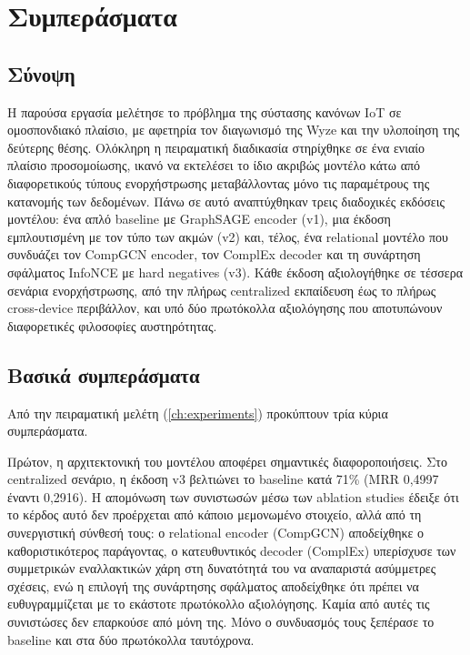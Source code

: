 \chapter{Συμπεράσματα}\label{ch:conclusions}

\section{Σύνοψη}\label{sec:concl-summary}
Η παρούσα εργασία μελέτησε το πρόβλημα της σύστασης κανόνων IoT σε ομοσπονδιακό πλαίσιο, με αφετηρία τον διαγωνισμό της Wyze και την υλοποίηση της δεύτερης θέσης. Ολόκληρη η πειραματική διαδικασία στηρίχθηκε σε ένα ενιαίο πλαίσιο προσομοίωσης, ικανό να εκτελέσει το ίδιο ακριβώς μοντέλο κάτω από διαφορετικούς τύπους ενορχήστρωσης μεταβάλλοντας μόνο τις παραμέτρους της κατανομής των δεδομένων. Πάνω σε αυτό αναπτύχθηκαν τρεις διαδοχικές εκδόσεις μοντέλου: ένα απλό baseline με GraphSAGE encoder (v1), μια έκδοση εμπλουτισμένη με τον τύπο των ακμών (v2) και, τέλος, ένα relational μοντέλο που συνδυάζει τον CompGCN encoder, τον ComplEx decoder και τη συνάρτηση σφάλματος InfoNCE με hard negatives (v3). Κάθε έκδοση αξιολογήθηκε σε τέσσερα σενάρια ενορχήστρωσης, από την πλήρως centralized εκπαίδευση έως το πλήρως cross-device περιβάλλον, και υπό δύο πρωτόκολλα αξιολόγησης που αποτυπώνουν διαφορετικές φιλοσοφίες αυστηρότητας.

\section{Βασικά συμπεράσματα}\label{sec:concl-findings}
Από την πειραματική μελέτη (\autoref{ch:experiments}) προκύπτουν τρία κύρια συμπεράσματα.

Πρώτον, η αρχιτεκτονική του μοντέλου αποφέρει σημαντικές διαφοροποιήσεις. Στο centralized σενάριο, η έκδοση v3 βελτιώνει το baseline κατά 71\% (MRR 0,4997 έναντι 0,2916). Η απομόνωση των συνιστωσών μέσω των ablation studies έδειξε ότι το κέρδος αυτό δεν προέρχεται από κάποιο μεμονωμένο στοιχείο, αλλά από τη συνεργιστική σύνθεσή τους: ο relational encoder (CompGCN) αποδείχθηκε ο καθοριστικότερος παράγοντας, ο κατευθυντικός decoder (ComplEx) υπερίσχυσε των συμμετρικών εναλλακτικών χάρη στη δυνατότητά του να αναπαριστά ασύμμετρες σχέσεις, ενώ η επιλογή της συνάρτησης σφάλματος αποδείχθηκε ότι πρέπει να ευθυγραμμίζεται με το εκάστοτε πρωτόκολλο αξιολόγησης. Καμία από αυτές τις συνιστώσες δεν επαρκούσε από μόνη της. Μόνο ο συνδυασμός τους ξεπέρασε το baseline και στα δύο πρωτόκολλα ταυτόχρονα.

